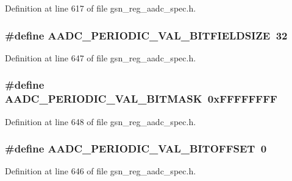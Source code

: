 Definition at line 617 of file gsn\_\-reg\_\-aadc\_\-spec.h.

\hypertarget{a00543_a84d89fb74c759585e8ca47416e715ae5}{
\subsubsection[{AADC\_\-PERIODIC\_\-VAL\_\-BITFIELDSIZE}]{\setlength{\rightskip}{0pt plus 5cm}\#define AADC\_\-PERIODIC\_\-VAL\_\-BITFIELDSIZE~32}}
\label{a00543_a84d89fb74c759585e8ca47416e715ae5}


Definition at line 647 of file gsn\_\-reg\_\-aadc\_\-spec.h.

\hypertarget{a00543_a21f9d5ddd52cab3aafa49eb21490377b}{
\subsubsection[{AADC\_\-PERIODIC\_\-VAL\_\-BITMASK}]{\setlength{\rightskip}{0pt plus 5cm}\#define AADC\_\-PERIODIC\_\-VAL\_\-BITMASK~0xFFFFFFFF}}
\label{a00543_a21f9d5ddd52cab3aafa49eb21490377b}


Definition at line 648 of file gsn\_\-reg\_\-aadc\_\-spec.h.

\hypertarget{a00543_a6f2365cd2e07540e1b9a8095582c4faf}{
\subsubsection[{AADC\_\-PERIODIC\_\-VAL\_\-BITOFFSET}]{\setlength{\rightskip}{0pt plus 5cm}\#define AADC\_\-PERIODIC\_\-VAL\_\-BITOFFSET~0}}
\label{a00543_a6f2365cd2e07540e1b9a8095582c4faf}


Definition at line 646 of file gsn\_\-reg\_\-aadc\_\-spec.h.

